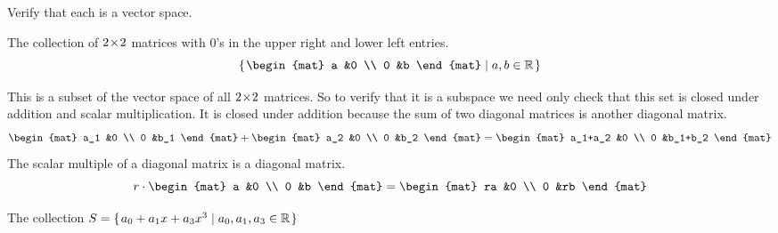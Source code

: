 \documentclass[answers]{examjh}
\begin{document}
\begin{questions}
\question Verify that each is a vector space.   
\begin{parts}   
  \item The collection of $2 \! \times \! 2$ matrices with $0$'s in the
     upper right and lower left entries.     
     \begin{equation*}       
       \set{         
         \begin{mat}           
           a  &0  \\ 
           0  &b          
        \end{mat}         
        \suchthat a,b\in\Re}     
     \end{equation*}
   \begin{solution}
   This is a subset of the vector space of all $2 \! \times \! 2$ matrices. 
   So
   to verify that it is a subspace we need only check that this set
   is closed under addition and scalar multiplication.
   It is closed under addition because the sum of two diagonal matrices
   is another diagonal matrix.
   \begin{equation*}
      \begin{mat}           
        a_1  &0  \\ 
        0    &b_1          
      \end{mat}
      +
      \begin{mat}           
        a_2  &0  \\ 
        0    &b_2          
      \end{mat}
      =
      \begin{mat}           
        a_1+a_2  &0        \\ 
        0        &b_1+b_2          
      \end{mat}         
   \end{equation*}
   The scalar multiple of a diagonal matrix
   is a diagonal matrix.
   \begin{equation*}
      r\cdot\begin{mat}           
        a  &0  \\ 
        0  &b          
      \end{mat}
      =
      \begin{mat}           
        ra    &0        \\ 
        0     &rb          
      \end{mat}         
   \end{equation*}
   \end{solution}
  \item The collection $S=\mbox{$\{\hspace{0.1em}a_0+a_1x+a_3x^3 \mid a_0,a_1,a_3\in\mathbb{R}\hspace{0.1em}\}$}$

\end{parts}
\end{questions}
\end{document}
